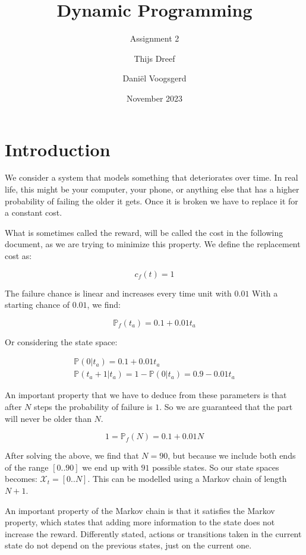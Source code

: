 \documentclass{uniarticle}
\title{Dynamic Programming}
\subtitle{Assignment 2}
\author{Thijs Dreef}
\author{Dani\"el Voogsgerd}
\date{November 2023}
\begin{document}
\maketitle

\section{Introduction}

We consider a system that models something that deteriorates over time. In real
life, this might be your computer, your phone, or anything else that has a higher
probability of failing the older it gets. Once it is broken we have to replace
it for a constant cost.

What is sometimes called the reward, will be called the cost in the following
document, as we are trying to minimize this property. We define the replacement
cost as:

\begin{equation}
    c_f(t) = 1
\end{equation}

The failure chance is linear and increases every time unit with $0.01$ With a
starting chance of $0.01$, we find:

\begin{equation}
    \mathbb{P}_f(t_a) = 0.1 + 0.01 t_a
\end{equation}

Or considering the state space:

\begin{gather}
    \mathbb{P}(0|t_a) = 0.1 + 0.01 t_a \\
    \mathbb{P}(t_a + 1|t_a) = 1 - \mathbb{P}(0|t_a) = 0.9 - 0.01 t_a
\end{gather}

An important property that we have to deduce from these parameters is that after
$N$ steps the probability of failure is $1$. So we are guaranteed that the part will
never be older than $N$.

\begin{equation}
    1 = \mathbb{P}_f(N) = 0.1 + 0.01 N
\end{equation}

After solving the above, we find that $N = 90$, but because we include both ends
of the range $[0..90]$ we end up with $91$ possible states. So our state spaces
becomes: $\mathcal{X}_t = [0..N]$.
This can be modelled using a Markov chain of length $N+1$.

An important property of the Markov chain is that it satisfies the Markov
property, which states that adding more information to the state does not
increase the reward. Differently stated, actions or transitions taken in
the current state do not depend on the previous states, just on the current one.
\end{document}
